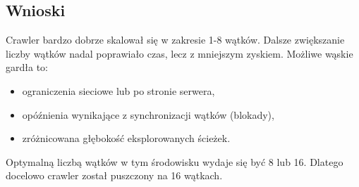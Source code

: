 \subsection{Wnioski}

Crawler bardzo dobrze skalował się w zakresie 1-8 wątków. Dalsze zwiększanie liczby wątków nadal poprawiało czas, lecz z mniejszym zyskiem. Możliwe wąskie gardła to:
\begin{itemize}
    \item ograniczenia sieciowe lub po stronie serwera,
    \item opóźnienia wynikające z synchronizacji wątków (blokady),
    \item zróżnicowana głębokość eksplorowanych ścieżek.
\end{itemize}

Optymalną liczbą wątków w tym środowisku wydaje się być 8 lub 16. Dlatego docelowo crawler został puszczony na 16 wątkach.


